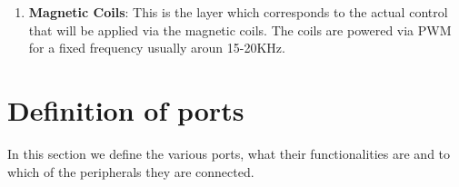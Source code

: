 \documentclass[11pt,a4paper]{report}
\begin{document}
\begin{enumerate}
\item 
\textbf{Magnetic Coils}: This is the layer which corresponds to the actual control that will be applied via the magnetic coils. The coils are powered via PWM for a fixed frequency usually aroun 15-20KHz. 
\end{enumerate}


\section{Definition of ports}

In this section we define the various ports, what their functionalities are and to which of the peripherals they are connected. 

\end{document}
